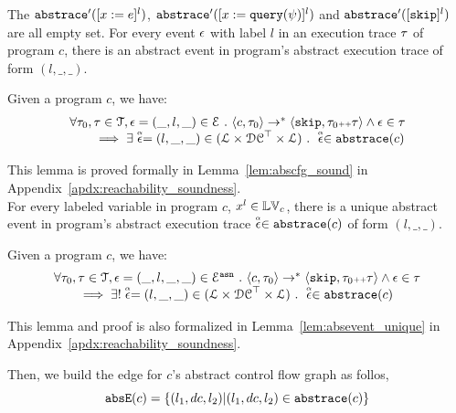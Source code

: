    The $\mathtt{abs}{\mathtt{trace}}'([x := e]^{l})$, $\mathtt{abs}{\mathtt{trace}}'([x := {\tt query}(\psi)]^{l})$ and $\mathtt{abs}{\mathtt{trace}}'([\mathtt{skip}]^{l})$ are all empty set. 
   For every event $\mathtt{\epsilon}$ with label $l$ in an execution trace $\mathtt{\tau}$ of program $c$, 
   there is an abstract event in program's abstract execution trace of form $(l, \_, \_)$. 
   \begin{lem}
     \label{lem:abscfg_sound}
   Given a program ${c}$, we have:
   \[
     \begin{array}{l}
       \forall \mathtt{\tau}_0, \mathtt{\tau} \in \mathcal{T} ,  \mathtt{\epsilon} = (\_, l, \_) \in \mathcal{E} ~.~
   \langle {c}, \mathtt{\tau}_0 \rangle \to^{*} \langle \mathtt{skip}, \mathtt{\tau}_0 {\scriptscriptstyle ++} \mathtt{\tau} \rangle 
   \land \mathtt{\epsilon} \in \mathtt{\tau} 
   \\
   \qquad \implies \exists \stackrel{\scriptscriptstyle{\alpha}}{\mathtt{\epsilon}{}} = (l, \_, \_) \in (\mathcal{L}\times \mathcal{DC}^{\top} \times \mathcal{L}) ~.~ 
   \stackrel{\scriptscriptstyle{\alpha}}{\mathtt{\epsilon}{}} \in \mathtt{abs}{\mathtt{trace}}(c)
   \end{array}
   \]
   \end{lem}
This lemma is proved formally in Lemma~\ref{lem:abscfg_sound} in Appendix~\ref{apdx:reachability_soundness}.
\\
For every labeled variable in program $c$, $x^l \in \mathbb{LV}_c$, there is a unique abstract event in program's abstract execution trace $\stackrel{\scriptscriptstyle{\alpha}}{\mathtt{\epsilon}{}} \in \mathtt{abs}{\mathtt{trace}}(c)$ of form $(l, \_, \_)$. 
\begin{lem}
  \label{lem:abscfg_unique}
Given a program ${c}$, we have:
%
\[
  \begin{array}{l}
    \forall \mathtt{\tau}_0, \mathtt{\tau} \in \mathcal{T} ,  \mathtt{\epsilon} = (\_, l, \_, \_) \in \mathcal{E}^{\mathtt{{asn}}} ~.~
\langle {c}, \mathtt{\tau}_0 \rangle \to^{*} \langle \mathtt{skip}, \mathtt{\tau}_0 {\scriptscriptstyle ++} \mathtt{\tau} \rangle 
\land \mathtt{\epsilon} \in \mathtt{\tau} 
\\
\qquad \implies \exists! \stackrel{\scriptscriptstyle{\alpha}}{\mathtt{\epsilon}{}} = (l, \_, \_) \in (\mathcal{L}\times \mathcal{DC}^{\top} \times \mathcal{L}) ~.~ 
\stackrel{\scriptscriptstyle{\alpha}}{\mathtt{\epsilon}{}} \in \mathtt{abs}{\mathtt{trace}}(c)
\end{array}
\]
\end{lem}
This lemma and proof is also 
formalized in Lemma~\ref{lem:absevent_unique} in Appendix~\ref{apdx:reachability_soundness}.

Then, we build the edge for $c$'s abstract control flow graph as follos,
\[
  \mathtt{abs}{\mathtt{E}}(c) = \{(l_1, dc, l_2) | (l_1, dc, l_2) \in \mathtt{abs}{\mathtt{trace}}(c)\}
  \]

